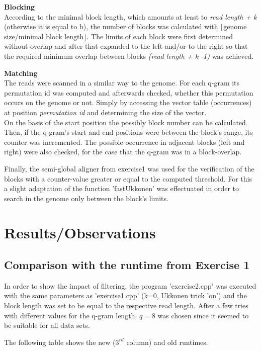 \documentclass[11pt, notitlepage]{scrartcl}
\begin{document}
\textbf{Blocking}\\
According to the minimal block length, which amounts at least to \textit{read length + k} (otherwise it is equal to b), the number of blocks was calculated with $\lfloor$genome size/minimal block length$\rfloor$. The limits of each block were first determined without overlap and after that expanded to the left and/or to the right so that the required minimum overlap between blocks \textit{(read length + k -1)} was achieved.

\textbf{Matching}\\
The reads were scanned in a similar way to the genome. For each q-gram its permutation id was computed and afterwards checked, whether this permutation occurs on the genome or not. Simply by accessing the vector table (occurrences) at position \textit{permutation id} and determining the size of the vector.\\
On the basis of the start position the possibly block number can be calculated. Then, if the q-gram's start and end
positions were between the block's range, its counter was incremented. The possible occurrence in adjacent blocks (left and right) were also checked, for the case that the q-gram was in a block-overlap.

Finally, the semi-global aligner from exercise1 was used for the verification of the blocks with a counter-value
greater or equal to the computed threshold. For this a slight adaptation of the function 'fastUkkonen' was
effectuated in order to search in the genome only between the block's limits.

\section{Results/Observations}
\subsection*{Comparison with the runtime from Exercise 1}
In order to show the impact of filtering, the program 'exercise2.cpp' was executed with the same parameters as 'exercise1.cpp' (k=0, Ukkonen trick 'on') and the block length was set to be equal to the respective read length. After a few tries with different values for the q-gram length, $q=8$ was chosen since it seemed to be suitable for all data sets.

The following table shows the new  ($3^{rd}$ column) and old runtimes.
\end{document}
